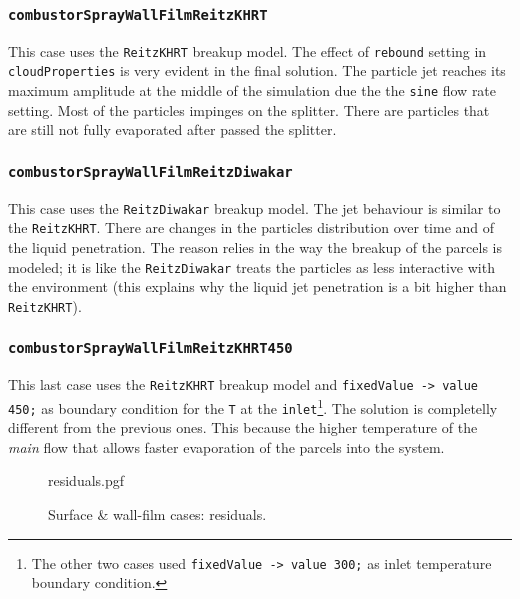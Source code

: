     \cprotect\subsubsection{\verb|combustorSprayWallFilmReitzKHRT|}
    This case uses the \verb|ReitzKHRT| breakup model. The effect of \verb|rebound| setting in \verb|cloudProperties| is very evident in the final solution. The particle jet reaches its maximum amplitude at the middle of the simulation due the the \verb|sine| flow rate setting. Most of the particles impinges on the splitter. There are particles that are still not fully evaporated after passed the splitter. 

    \cprotect\subsubsection{\verb|combustorSprayWallFilmReitzDiwakar|}
    This case uses the \verb|ReitzDiwakar| breakup model. The jet behaviour is similar to the \verb|ReitzKHRT|. There are changes in the particles distribution over time and of the liquid penetration. The reason relies in the way the breakup of the parcels is modeled; it is like the \verb|ReitzDiwakar| treats the particles as less interactive with the environment (this explains why the liquid jet penetration is a bit higher than \verb|ReitzKHRT|).

    \cprotect\subsubsection{\verb|combustorSprayWallFilmReitzKHRT450|}
    This last case uses the \verb|ReitzKHRT| breakup model and \verb|fixedValue -> value 450;| as boundary condition for the \verb|T| at the \verb|inlet|\cprotect\footnote{The other two cases used \verb|fixedValue -> value 300;| as inlet temperature boundary condition.}. The solution is completelly different from the previous ones. This because the higher temperature of the \textit{main} flow that allows faster evaporation of the parcels into the system.

    \newpage

    \setcounter{lastPage}{\thepage}
    \renewcommand{\thepage}{SWF-\roman{page}}
    \setcounter{page}{1}

    \begin{figure}[!ht]
        \centering
        {residuals.pgf}
        \caption{Surface \& wall-film cases: residuals.}
    \end{figure}

